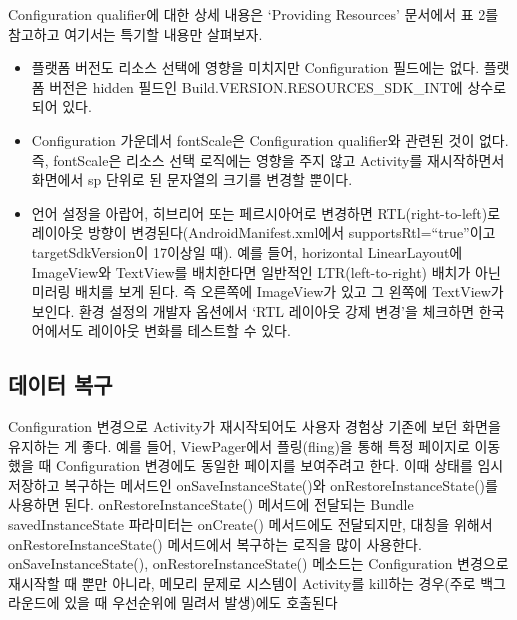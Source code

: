 Configuration qualifier에 대한 상세 내용은 `Providing Resources' 문서에서 표 2를 참고하고 여기서는 특기할 내용만 살펴보자.
\begin{itemize}
\item 플랫폼 버전도 리소스 선택에 영향을 미치지만  Configuration 필드에는 없다. 플랫폼 버전은 hidden 필드인 Build.VERSION.RESOURCES\_SDK\_INT에 상수로 되어 있다. 

\item Configuration 가운데서 fontScale은 Configuration qualifier와 관련된 것이 없다. 즉, fontScale은 리소스 선택 로직에는 영향을 주지 않고 Activity를 재시작하면서 화면에서 sp 단위로 된 문자열의 크기를 변경할 뿐이다.

\item 언어 설정을 아랍어, 히브리어 또는 페르시아어로 변경하면 RTL(right-to-left)로 레이아웃 방향이 변경된다(AndroidManifest.xml에서 supportsRtl=``true''이고 targetSdkVersion이 17이상일 때). 예를 들어, horizontal LinearLayout에 ImageView와 TextView를 배치한다면 일반적인 LTR(left-to-right) 배치가 아닌 미러링 배치를 보게 된다. 즉 오른쪽에 ImageView가 있고 그 왼쪽에 TextView가 보인다. 환경 설정의 개발자 옵션에서 `RTL 레이아웃 강제 변경'을 체크하면 한국어에서도 레이아웃 변화를 테스트할 수 있다. 
\end{itemize}

\subsection{데이터 복구}
Configuration 변경으로 Activity가 재시작되어도 사용자 경험상 기존에 보던 화면을 유지하는 게 좋다. 
예를 들어, ViewPager에서 플링(fling)을 통해 특정 페이지로 이동했을 때 Configuration 변경에도 동일한 페이지를 보여주려고 한다. 이때 상태를 임시 저장하고 복구하는 메서드인 onSaveInstanceState()와 onRestoreInstanceState()를 사용하면 된다. onRestoreInstanceState() 메서드에 전달되는 Bundle savedInstanceState 파라미터는 onCreate() 메서드에도 전달되지만, 대칭을 위해서 onRestoreInstanceState() 메서드에서 복구하는 로직을 많이 사용한다.
onSaveInstanceState(), onRestoreInstanceState() 메소드는 Configuration 변경으로 재시작할 때 뿐만 아니라, 메모리 문제로 시스템이 Activity를 kill하는 경우(주로 백그라운드에 있을 때 우선순위에 밀려서 발생)에도 호출된다\\

